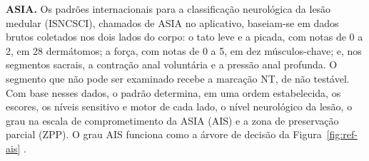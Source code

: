 \textbf{ASIA.} Os padrões internacionais para a classificação neurológica da lesão medular (ISNCSCI), chamados de
ASIA no aplicativo, baseiam-se em dados brutos coletados nos dois lados do corpo: o tato leve e a picada, com notas
de 0 a 2, em 28 dermátomos; a força, com notas de 0 a 5, em dez músculos-chave; e, nos segmentos sacrais, a
contração anal voluntária e a pressão anal profunda. O segmento que não pode ser examinado recebe a marcação NT, de
não testável. Com base nesses dados, o padrão determina, em uma ordem estabelecida, os escores, os níveis sensitivo
e motor de cada lado, o nível neurológico da lesão, o grau na escala de comprometimento da ASIA (AIS) e a zona de
preservação parcial (ZPP). O grau AIS funciona como a árvore de decisão da Figura~\ref{fig:ref-ais}
\cite[p.~9,~12,~15--22]{rupp2021isncsci}.

